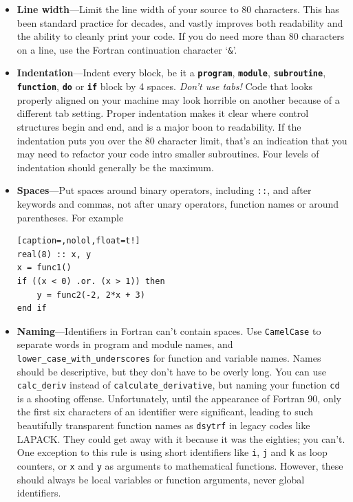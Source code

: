 \documentclass[openany,oneside]{report}
\newcommand{\keyword}[1]{\texttt{\bfseries\color{DarkBlue}#1}}
\begin{document}
\begin{itemize}
  \item\textbf{Line width}---Limit the line width of your source to 80 characters.
    This has been standard practice for decades, and vastly improves both readability and the ability to cleanly print your code.
    If you do need more than 80 characters on a line, use the Fortran continuation character `\texttt{\&}'.
  \item\textbf{Indentation}---Indent every block, be it  a \keyword{program}, \keyword{module}, \keyword{subroutine}, \keyword{function}, \keyword{do} or \keyword{if} block by 4 spaces.
    \emph{Don't use tabs!} Code that looks properly aligned on your machine may look horrible on another because of a different tab setting.
    Proper indentation makes it clear where control structures begin and end, and is a major boon to readability.
    If the indentation puts you over the 80 character limit, that's an indication that you may need to refactor your code intro smaller subroutines.
    Four levels of indentation should generally be the maximum.
  \item\textbf{Spaces}---Put spaces around binary operators, including \texttt{::}, and after keywords and commas, not after unary operators, function names or around parentheses. For example\newpage
\begin{lstlisting}[caption=,nolol,float=t!]
real(8) :: x, y
x = func1()
if ((x < 0) .or. (x > 1)) then
    y = func2(-2, 2*x + 3)
end if
\end{lstlisting}
  \item\textbf{Naming}---Identifiers in Fortran can't contain spaces.
    Use \texttt{CamelCase} to separate words in program and module names, and \texttt{lower\_case\_with\_underscores} for function and variable names.
    Names should be descriptive, but they don't have to be overly long.
    You can use \texttt{calc\_deriv} instead of \texttt{calculate\_derivative}, but naming your function \texttt{cd} is a shooting offense.
    Unfortunately, until the appearance of Fortran 90, only the first six characters of an identifier were significant, leading to such beautifully transparent function names as \texttt{dsytrf} in legacy codes like LAPACK.
    They could get away with it because it was the eighties; you can't.
    One exception to this rule is using short identifiers like \texttt{i}, \texttt{j} and \texttt{k} as loop counters, or \texttt{x} and \texttt{y} as arguments to mathematical functions.
    However, these should always be local variables or function arguments, never global identifiers.

\end{itemize}
\end{document}
